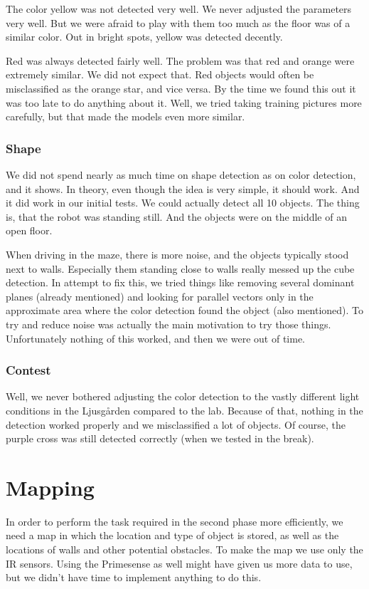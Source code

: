 \documentclass[10pt,a4paper,twocolumn]{article}
\begin{document}
The color yellow was not detected very well. We never adjusted the parameters
very well. But we were afraid to play with them too much as the floor was of a
similar color. Out in bright spots, yellow was detected decently.

Red was always detected fairly well. The problem was that red and orange were
extremely similar. We did not expect that. Red objects would often be
misclassified as the orange star, and vice versa. By the time we found this out
it was too late to do anything about it. Well, we tried taking training pictures
more carefully, but that made the models even more similar.

\subsubsection{Shape}
We did not spend nearly as much time on shape detection as on color detection,
and it shows. In theory, even though the idea is very simple, it should work.
And it did work in our initial tests. We could actually detect all 10 objects.
The thing is, that the robot was standing still. And the objects were on the
middle of an open floor.

When driving in the maze, there is more noise, and the objects typically stood
next to walls. Especially them standing close to walls really messed up the cube
detection. In attempt to fix this, we tried things like removing several
dominant planes (already mentioned) and looking for parallel vectors only in the
approximate area where the color detection found the object (also mentioned). To
try and reduce noise was actually the main motivation to try those things.
Unfortunately nothing of this worked, and then we were out of time.

\subsubsection{Contest}
Well, we never bothered adjusting the color detection to the vastly different
light conditions in the Ljusg{\aa}rden compared to the lab. Because of that, nothing
in the detection worked properly and we misclassified a lot of objects. Of
course, the purple cross was still detected correctly (when we tested in the
break).

\section{Mapping}
In order to perform the task required in the second phase more efficiently, we
need a map in which the location and type of object is stored, as well as the
locations of walls and other potential obstacles. To make the map we use only
the IR sensors. Using the Primesense as well might have given us more data to
use, but we didn't have time to implement anything to do this.
\end{document}
